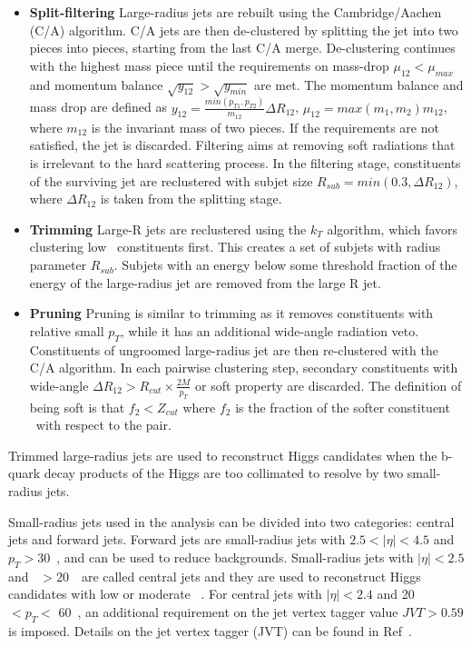 \begin{itemize}
    \item \textbf{Split-filtering} Large-radius jets are rebuilt using the Cambridge/Aachen (C/A) algorithm. C/A jets are then de-clustered by splitting the jet into two pieces into pieces, starting from the last C/A merge. De-clustering continues with the highest mass piece 
    until the requirements on mass-drop $\mu_{12} < \mu_{max}$ and momentum balance $\sqrt{y_{12}} > \sqrt{y_{min}}$ are met. The momentum balance and mass drop are defined as $y_{12} = \frac{min(p_{T1},p_{T2})}{m_{12}}\Delta R_{12} $, $\mu_{12} = max(m_1,m_2) m_{12}$, where $m_{12}$ 
    is the invariant mass of two pieces. If the requirements are not satisfied, the jet is discarded. Filtering aims at removing soft radiations that is irrelevant to the hard scattering process. 
    In the filtering stage, constituents of the surviving jet are reclustered with subjet size $R_{sub} = min(0.3,\Delta R_{12})$, where $\Delta R_{12}$ is taken from the splitting stage.
    \item \textbf{Trimming} Large-R jets are reclustered using the $k_T$ algorithm, 
    which favors clustering low \pt~constituents first. This creates a set of subjets with radius parameter $R_{sub}$. 
    Subjets with an energy below some threshold fraction of the energy of the large-radius jet are removed from the large R jet.
    \item \textbf{Pruning} Pruning is similar to trimming as it removes constituents with relative small $p_T$, while it has an additional wide-angle radiation veto. 
    Constituents of ungroomed large-radius jet are then re-clustered with the C/A algorithm. In each pairwise clustering step, secondary constituents with wide-angle 
    $\Delta R_{12} > R_{cut} \times \frac{2M}{p_T}$ or soft property are discarded. The definition of being soft is that $f_2 < Z_{cut}$ where $f_2$ is the fraction of the softer constituent \pt~with respect to the pair.
\end{itemize}

\par Trimmed large-radius jets are used to reconstruct Higgs candidates when the b-quark decay products of the Higgs are too collimated to resolve by two small-radius jets.

\par Small-radius jets used in the analysis can be divided into two categories: central jets and forward jets. Forward jets are small-radius jets with $2.5 < |\eta| < 4.5$ and $p_T > 30$~\GeV, and can be used to reduce backgrounds. 
Small-radius jets with $|\eta| < 2.5$ and \pt~$> 20$~\GeV~are called central jets and they are used to reconstruct Higgs candidates with low or moderate \pt~.
For central jets with $|\eta| < 2.4$ and 20~\GeV~$< p_T <$ 60~\GeV, an additional requirement on the jet vertex tagger value $JVT > 0.59$ is imposed. Details on the jet vertex tagger (JVT) can be found in Ref~\cite{Aad:2015ina}.

